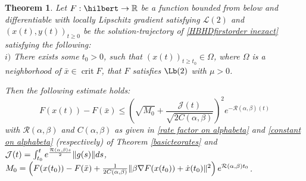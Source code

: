 \documentclass[reqno]{amsart}
\theoremstyle{plain}
\newtheorem{theorem}{Theorem}	%
\theoremstyle{definition}
\theoremstyle{remark}
\newcommand{\R}{\mathbb{R}}	%
\DeclareMathOperator{\crit}{crit}	%
\DeclarePairedDelimiter{\norm}{\lVert}{\rVert}	%
\newcommand{\Jb}{\mathcal{J}}
\newcommand{\Rb}{\mathcal{R}}
\begin{document}
\begin{theorem}\label{basicteorates firstorder}
Let $F:\hilbert\to\R$ be a function bounded from below and differentiable with locally Lipschitz gradient satisfying \hyperref[PL]{$\mathcal{L}(2)$} and $\left(x(t),y(t)\right)_{t\geq0}$ be the solution-trajectory of \eqref{HBHDfirstorder inexact} satisfying the following:\\
$i)$ There exists some $t_{0}>0$, such that  $\left(x(t)\right)_{t\geq t_{0}} \in \Omega$,  where $\Omega$ is a neighborhood of $\bar{x}\in \crit{F}$, that $F$ satisfies $\Lb(2)$ with $\mu>0$.

Then the following estimate holds:
\begin{equation}
	F(x(t))-F(\bar{x}) \leq \left(\sqrt{M_{0}}+\frac{\Jb(t)}{\sqrt{2C(\alpha,\beta)}}\right)^{2}e^{-\Rb(\alpha,\beta)(t)}
\end{equation} 
with $\Rb(\alpha,\beta)$ and $C(\alpha,\beta)$ as given in \eqref{rate factor on alphabeta} and \eqref{constant on alphabeta} (respectively) of Theorem \ref{basicteorates}
and $\Jb(t)=\int_{t_{0}}^{t}e^{\frac{\Rb(\alpha,\beta)s}{2}}\norm{g(s)}ds$, $M_{0}=\left(F(x(t_{0}))-F(\bar{x}) +\frac{1}{2C(\alpha,\beta)}\norm{\beta\nabla F(x(t_{0}))+\dot{x}(t_{0})}^{2}\right)e^{\Rb(\alpha,\beta)t_{0}}$.


\end{theorem}
\end{document}
